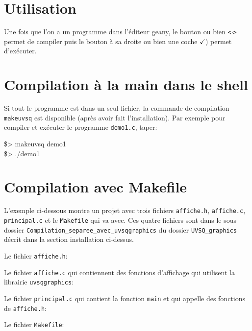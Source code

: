 \documentclass{report}
\newcommand\code[1]{
\begin{mdframed}[linecolor=purple,backgroundcolor=blue!10]
{\tt
#1
}
\end{mdframed}
}
\begin{document}
\section{Utilisation}
Une fois que l'on a un programme dans l'éditeur geany, le bouton  ou bien \texttt{<$\cdot$>} permet de compiler
puis le bouton à sa droite  ou bien une coche $\checkmark$) permet d'exécuter.

\section{Compilation à la main dans le shell}
Si tout le programme est dans un seul fichier, la commande de compilation \texttt{makeuvsq} est disponible (après avoir fait l'installation).
Par exemple pour compiler et exécuter le programme \texttt{demo1.c}, taper:
\code{
\$> makeuvsq demo1\\
\$> ./demo1
}

\section{Compilation avec Makefile}

L'exemple ci-dessous montre un projet avec trois fichiers \texttt{affiche.h}, \texttt{affiche.c}, \texttt{principal.c} 
et le \texttt{Makefile} qui va avec. Ces quatre fichiers sont dans le sous dossier 
\texttt{Compilation\_separee\_avec\_uvsqgraphics} du dossier \texttt{UVSQ\_graphics} décrit dans la section installation ci-dessus.

\vspace{5mm}
Le fichier \texttt{affiche.h}:
\code{  }

Le fichier \texttt{affiche.c} qui contiennent des fonctions d'affichage qui utilisent la librairie \texttt{uvsqgraphics}:\code{  }

Le fichier \texttt{principal.c} qui contient la fonction \texttt{main} et qui appelle des fonctions de \texttt{affiche.h}:
\code{  }

Le fichier \texttt{Makefile}:
\code{  }
\end{document}
